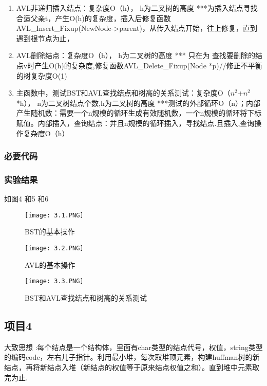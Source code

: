 \begin{enumerate}
\item  AVL非递归插入结点：复杂度O（h）， h为二叉树的高度      ***为插入结点寻找合适父亲t，产生O(h)的复杂度，插入后修复函数AVL\_Insert\_Fixup(NewNode->parent)，从传入结点开始，往上修复，直到遇到根节点为止，
\item  AVL删除结点：复杂度O（h）， h为二叉树的高度      *** 只在为 查找要删除的结点v时产生O(h)的复杂度,修复函数AVL\_Delete\_Fixup(Node *p)//修正不平衡的树复杂度O(1)
\item  主函数中，测试BST和AVL查找结点和树高的关系测试：复杂度O（$n^2$+$n^2$*h）， n为二叉树结点个数,h为二叉树的高度  ***测试的外部循环O（n）；内部产生随机数：需要一个n规模的循环生成有效随机数，一个n规模的循环将下标赋值。内部插入，查询结点：并且n规模的循环插入，寻找结点.且插入,查询操作复杂度O（h）
\end{enumerate}
\subsubsection{必要代码}



\subsubsection{实验结果}如图4 和5 和6
	\begin{figure}[!bthp]
	\centering
        \texttt{[image: 3.1.PNG]}
        \caption{BST的基本操作}
      \end{figure}
\begin{figure}[!bthp]
	\centering
         \texttt{[image: 3.2.PNG]}
        \caption{AVL的基本操作}
      \end{figure}

\begin{figure}[!bthp]
	\centering
         \texttt{[image: 3.3.PNG]}
        \caption{BST和AVL查找结点和树高的关系测试}
      \end{figure}


\subsection{项目4}
大致思想 :每个结点是一个结构体，里面有char类型的结点代号，权值，string类型的编码code，左右儿子指针。利用最小堆，每次取堆顶元素，构建huffman树的新结点，再将新结点入堆（新结点的权值等于原来结点权值之和）。直到堆中元素取完为止.
